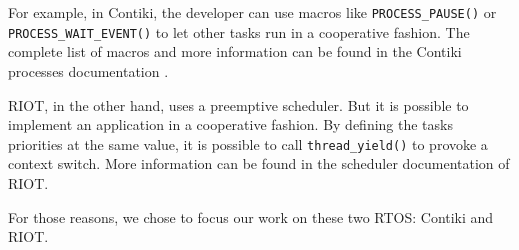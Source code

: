 For example, in Contiki, the developer can use macros like \texttt{PROCESS\_PAUSE()} or \texttt{PROCESS\_WAIT\_EVENT()} to let other tasks run in a cooperative fashion.
The complete list of macros and more information can be found in the Contiki processes documentation \cite{contiki-processes}.

RIOT, in the other hand, uses a preemptive scheduler.
But it is possible to implement an application in a cooperative fashion.
By defining the tasks priorities at the same value, it is possible to call \texttt{thread\_yield()} to provoke a context switch.
More information can be found in the scheduler documentation \cite{riot-scheduler} of RIOT.

For those reasons, we chose to focus our work on these two RTOS: Contiki and RIOT.